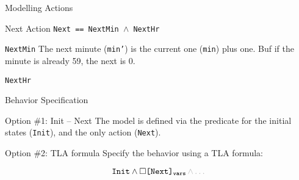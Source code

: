 \begin{frame}{Modelling Actions}
    \begin{block}{Next Action}
        \texttt{Next == NextMin $\land$ NextHr}
    \end{block}
    \pause
    \begin{block}{\texttt{NextMin}}
        The next minute (\texttt{min'}) is the current one (\texttt{min}) plus one. Buf if the minute is already 59, the next is 0.
        \demo
    \end{block}
    \pause
    \begin{block}{\texttt{NextHr}}
    \end{block}
\end{frame}

\begin{frame}{Behavior Specification}
    \begin{block}{Option \#1: Init -- Next}
        The model is defined via the predicate for the initial states (\texttt{Init}), and the only action (\texttt{Next}).
        \demo
    \end{block}
    \pause
    \begin{block}{Option \#2: TLA formula}
        Specify the behavior using a TLA formula:

        \[
            \texttt{Init} \land \square \texttt{[Next]}_{\texttt{vars}} \textcolor{gray!60}{\,\land \ldots}
        \]
        \demo
    \end{block}
\end{frame}


